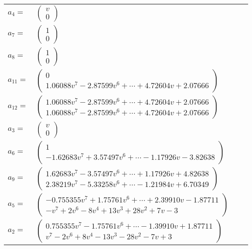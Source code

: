 \documentclass[1p]{elsarticle_modified}
\theoremstyle{definition}
\begin{document}
\begin{tabular}{m{7pt} m{180pt} m{7pt} m{180pt} }
\flushright $a_{4}=$&$\begin{pmatrix}v\\0\end{pmatrix}$ \\
\flushright $a_{7}=$&$\begin{pmatrix}1\\0\end{pmatrix}$ \\
\flushright $a_{8}=$&$\begin{pmatrix}1\\0\end{pmatrix}$ \\
\flushright $a_{11}=$&$\begin{pmatrix}0\\1.06088 v^{7}-2.87599 v^{6}+\cdots+4.72604 v+2.07666\end{pmatrix}$ \\
\flushright $a_{12}=$&$\begin{pmatrix}1.06088 v^{7}-2.87599 v^{6}+\cdots+4.72604 v+2.07666\\1.06088 v^{7}-2.87599 v^{6}+\cdots+4.72604 v+2.07666\end{pmatrix}$ \\
\flushright $a_{3}=$&$\begin{pmatrix}v\\0\end{pmatrix}$ \\
\flushright $a_{6}=$&$\begin{pmatrix}1\\-1.62683 v^{7}+3.57497 v^{6}+\cdots-1.17926 v-3.82638\end{pmatrix}$ \\
\flushright $a_{9}=$&$\begin{pmatrix}1.62683 v^{7}-3.57497 v^{6}+\cdots+1.17926 v+4.82638\\2.38219 v^{7}-5.33258 v^{6}+\cdots-1.21984 v+6.70349\end{pmatrix}$ \\
\flushright $a_{5}=$&$\begin{pmatrix}-0.755355 v^{7}+1.75761 v^{6}+\cdots+2.39910 v-1.87711\\- v^7+2 v^6-8 v^4+13 v^3+28 v^2+7 v-3\end{pmatrix}$ \\
\flushright $a_{2}=$&$\begin{pmatrix}0.755355 v^{7}-1.75761 v^{6}+\cdots-1.39910 v+1.87711\\v^7-2 v^6+8 v^4-13 v^3-28 v^2-7 v+3\end{pmatrix}$ \\

\end{tabular}
\end{document}
